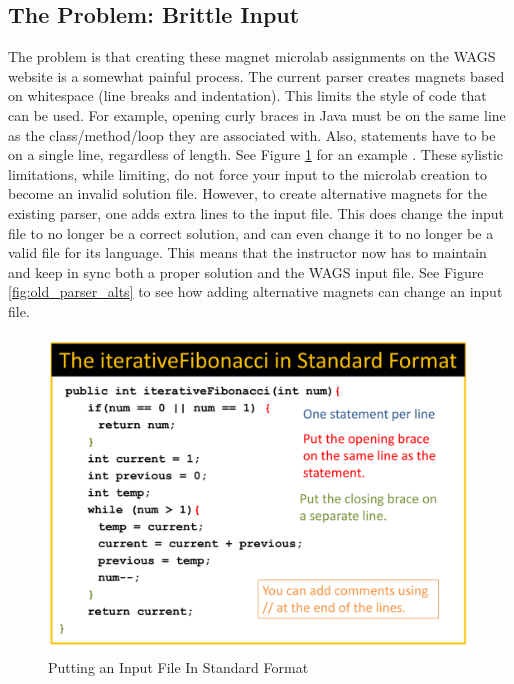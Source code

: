 \documentclass[letter,10pt]{article}
\begin{document}
\subsection{The Problem: Brittle Input}

The problem is that creating these magnet microlab assignments on the 
WAGS website is a somewhat painful process. The current parser creates 
magnets based on whitespace (line breaks and indentation). This limits 
the style of code that can be used. For example, opening curly braces 
in Java must be on the same line as the class/method/loop they are 
associated with. Also, statements have to be on a single line, 
regardless of length. See Figure \ref{fig:old_parser_style} for an 
example \cite{icer_pres_4_creating_lab}. These sylistic limitations, 
while limiting, do not force your input to the microlab creation to 
become an invalid solution file. However, to create alternative magnets 
for the existing parser, one adds extra lines to the input file. This 
does change the input file to no longer be a correct solution, and can 
even change it to no longer be a valid file for its language. This 
means that the instructor now has to maintain and keep in sync both a 
proper solution and the WAGS input file. See Figure 
\ref{fig:old_parser_alts} to see how adding alternative magnets 
can change an input file\cite{icer_pres_4_creating_lab}.

\begin{figure}
 \centering
 
\includegraphics[width=.8\linewidth, keepaspectratio=true
  ]{./images/CreatingCodeMagnetLab/old_parser_presentation-07.png}
 \caption{Putting an Input File In Standard Format}
 \label{fig:old_parser_style}
\end{figure}
\end{document}
